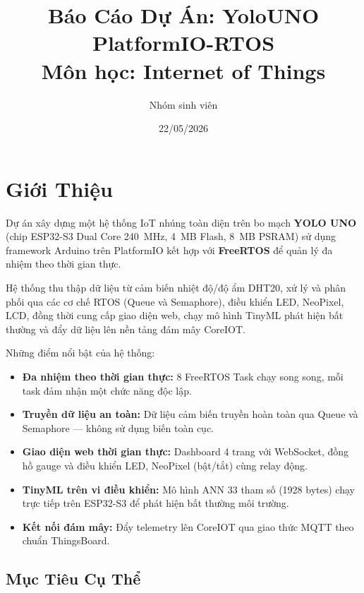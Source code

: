 \documentclass[12pt,a4paper]{article}
\title{\textbf{Báo Cáo Dự Án: YoloUNO PlatformIO-RTOS}\\
       \large Môn học: Internet of Things}
\author{Nhóm sinh viên}
\date{22/05/2026}
\begin{document}
\maketitle
\tableofcontents
\newpage

\section{Giới Thiệu}

Dự án xây dựng một hệ thống IoT nhúng toàn diện trên bo mạch \textbf{YOLO UNO} (chip ESP32-S3 Dual Core 240~MHz, 4~MB Flash, 8~MB PSRAM) sử dụng framework Arduino trên PlatformIO kết hợp với \textbf{FreeRTOS} để quản lý đa nhiệm theo thời gian thực.

Hệ thống thu thập dữ liệu từ cảm biến nhiệt độ/độ ẩm DHT20, xử lý và phân phối qua các cơ chế RTOS (Queue và Semaphore), điều khiển LED, NeoPixel, LCD, đồng thời cung cấp giao diện web, chạy mô hình TinyML phát hiện bất thường và đẩy dữ liệu lên nền tảng đám mây CoreIOT.

Những điểm nổi bật của hệ thống:
\begin{itemize}
    \item \textbf{Đa nhiệm theo thời gian thực:} 8 FreeRTOS Task chạy song song, mỗi task đảm nhận một chức năng độc lập.
    \item \textbf{Truyền dữ liệu an toàn:} Dữ liệu cảm biến truyền hoàn toàn qua Queue và Semaphore — không sử dụng biến toàn cục.
    \item \textbf{Giao diện web thời gian thực:} Dashboard 4 trang với WebSocket, đồng hồ gauge và điều khiển LED, NeoPixel (bật/tắt) cùng relay động.
    \item \textbf{TinyML trên vi điều khiển:} Mô hình ANN 33 tham số (1928 bytes) chạy trực tiếp trên ESP32-S3 để phát hiện bất thường môi trường.
    \item \textbf{Kết nối đám mây:} Đẩy telemetry lên CoreIOT qua giao thức MQTT theo chuẩn ThingsBoard.
\end{itemize}

\subsection{Mục Tiêu Cụ Thể}
\end{document}
